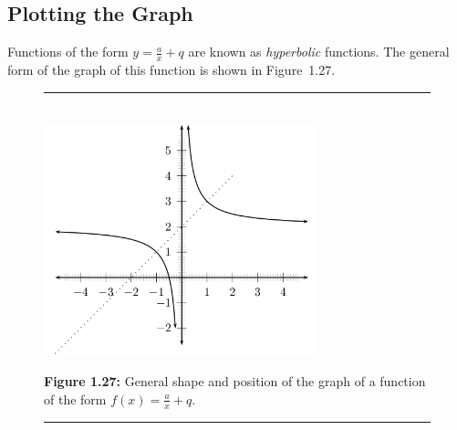  \subsection{Plotting the Graph}           
        \label{m39341*id246121}Functions of the form $y=\frac{a}{x}+q$ are known as \textsl{hyperbolic} functions. The general form of the graph of this function is shown in Figure~1.27.\par 
    \setcounter{subfigure}{0}
	\begin{figure}[H] %
    \begin{center}
    \rule[.1in]{\figurerulewidth}{.005in} \\
        \label{m39341*uid138!!!underscore!!!media}\label{m39341*uid138!!!underscore!!!printimage}\includegraphics[width=300px]{col11306.imgs/m39341_MG10C11_021.png} %
      \vspace{2pt}
    \vspace{\rubberspace}\par \begin{cnxcaption}
	  \small \textbf{Figure 1.27: }General shape and position of the graph of a function of the form $f\left(x\right)=\frac{a}{x}+q$.
	\end{cnxcaption}
    \vspace{.1in}
    \rule[.1in]{\figurerulewidth}{.005in} \\
    \end{center}
 \end{figure}       
\label{m39341*secfhsst!!!underscore!!!id2774}
